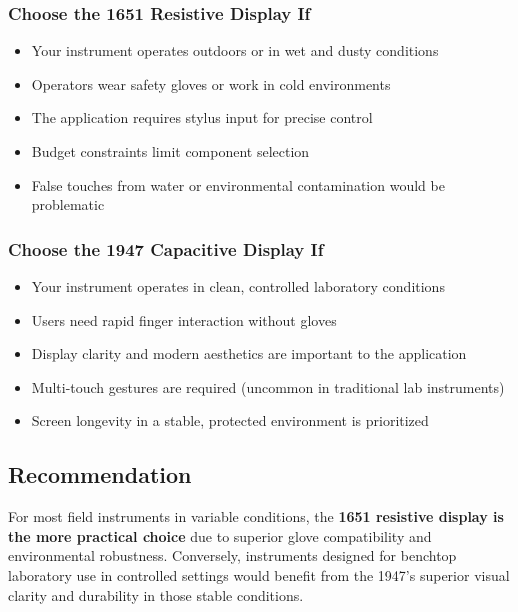 \subsubsection{Choose the 1651 Resistive Display If}

\begin{itemize}
  \item Your instrument operates outdoors or in wet and dusty conditions
  \item Operators wear safety gloves or work in cold environments
  \item The application requires stylus input for precise control
  \item Budget constraints limit component selection
  \item False touches from water or environmental contamination would be problematic
\end{itemize}

\subsubsection{Choose the 1947 Capacitive Display If}

\begin{itemize}
  \item Your instrument operates in clean, controlled laboratory conditions
  \item Users need rapid finger interaction without gloves
  \item Display clarity and modern aesthetics are important to the application
  \item Multi-touch gestures are required (uncommon in traditional lab instruments)
  \item Screen longevity in a stable, protected environment is prioritized
\end{itemize}

\subsection{Recommendation}

For most field instruments in variable conditions, the \textbf{1651 resistive display is the more practical choice} due to superior glove compatibility and environmental robustness. Conversely, instruments designed for benchtop laboratory use in controlled settings would benefit from the 1947's superior visual clarity and durability in those stable conditions.
